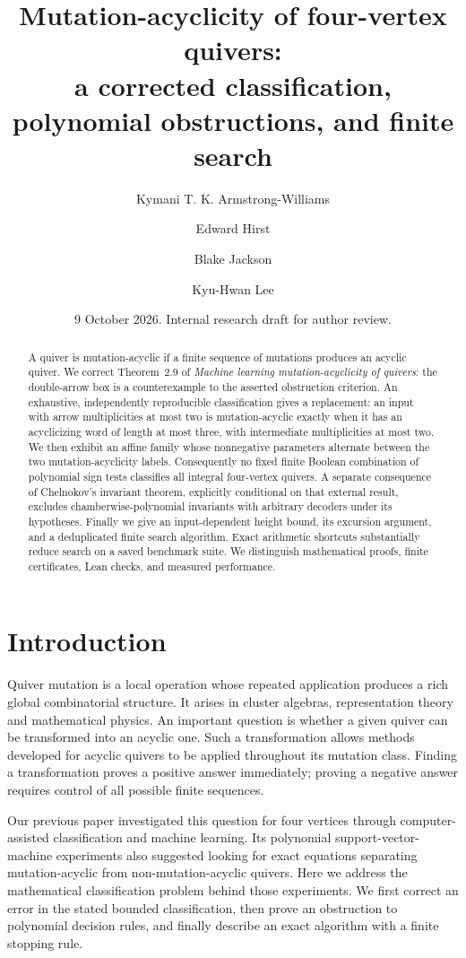 \documentclass[11pt]{amsart}
\title[Mutation-acyclicity of four-vertex quivers]{Mutation-acyclicity of four-vertex quivers:\\a corrected classification, polynomial obstructions, and finite search}
\author{Kymani T. K. Armstrong-Williams}
\author{Edward Hirst}
\author{Blake Jackson}
\author{Kyu-Hwan Lee}
\date{9 October 2026. Internal research draft for author review.}
\theoremstyle{definition}\newtheorem{definition}[theorem]{Definition}
\theoremstyle{remark}\newtheorem{remark}[theorem]{Remark}
\begin{document}
\begin{abstract}
A quiver is mutation-acyclic if a finite sequence of mutations produces an acyclic quiver. We correct Theorem~2.9 of \emph{Machine learning mutation-acyclicity of quivers}: the double-arrow box is a counterexample to the asserted obstruction criterion. An exhaustive, independently reproducible classification gives a replacement: an input with arrow multiplicities at most two is mutation-acyclic exactly when it has an acyclicizing word of length at most three, with intermediate multiplicities at most two. We then exhibit an affine family whose nonnegative parameters alternate between the two mutation-acyclicity labels. Consequently no fixed finite Boolean combination of polynomial sign tests classifies all integral four-vertex quivers. A separate consequence of Chelnokov's invariant theorem, explicitly conditional on that external result, excludes chamberwise-polynomial invariants with arbitrary decoders under its hypotheses. Finally we give an input-dependent height bound, its excursion argument, and a deduplicated finite search algorithm. Exact arithmetic shortcuts substantially reduce search on a saved benchmark suite. We distinguish mathematical proofs, finite certificates, Lean checks, and measured performance.
\end{abstract}
\maketitle

\section{Introduction}
Quiver mutation is a local operation whose repeated application produces a rich global combinatorial structure. It arises in cluster algebras, representation theory and mathematical physics. An important question is whether a given quiver can be transformed into an acyclic one. Such a transformation allows methods developed for acyclic quivers to be applied throughout its mutation class. Finding a transformation proves a positive answer immediately; proving a negative answer requires control of all possible finite sequences.

Our previous paper \cite{AHJL} investigated this question for four vertices through computer-assisted classification and machine learning. Its polynomial support-vector-machine experiments also suggested looking for exact equations separating mutation-acyclic from non-mutation-acyclic quivers. Here we address the mathematical classification problem behind those experiments. We first correct an error in the stated bounded classification, then prove an obstruction to polynomial decision rules, and finally describe an exact algorithm with a finite stopping rule.
\end{document}
